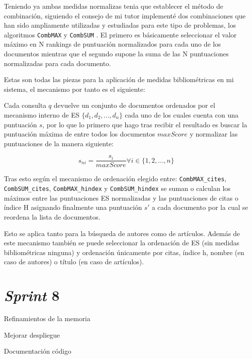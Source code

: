 Teniendo ya ambas medidas normalizas tenia que establecer el método de combinación, siguiendo el consejo de mi tutor implementé dos combinaciones que han sido ampliamente utilizadas y estudiadas para este tipo de problemas, los algoritmos \texttt{CombMAX} y \texttt{CombSUM} \cite{DBLP:conf/trec/ShawF94}. El primero es básicamente seleccionar el valor máximo en N rankings de puntuación normalizados para cada uno de los documentos mientras que el segundo supone la suma de las N puntuaciones normalizadas para cada documento. 

Estas son todas las piezas para la aplicación de medidas bibliométricas en mi sistema, el mecanismo por tanto es el siguiente:

Cada consulta $q$ devuelve un conjunto de documentos ordenados por el mecanismo interno de \acrshort{ES} $\{d_1, d_2, ..., d_n\}$ cada uno de los cuales cuenta con una puntuación $s$, por lo que lo primero que hago tras recibir el resultado es buscar la puntuación máxima de entre todos los documentos $maxScore$ y normalizar las puntuaciones de la manera siguiente:

\begin{equation}
s_{ni} = \frac{s_i}{maxScore} \forall i \in \{1, 2, ..., n\}
\end{equation}

Tras esto según el mecanismo de ordenación elegido entre: \texttt{CombMAX\_cites}, \texttt{CombSUM\_cites}, \texttt{CombMAX\_hindex} y \texttt{CombSUM\_hindex} se suman o calculan los máximos entre las puntuaciones \acrshort{ES} normalizadas y las puntuaciones de citas o índice H asignando finalmente una puntuación $s'$ a cada documento por la cual se reordena la lista de documentos.

Esto se aplica tanto para la búsqueda de autores como de artículos. Además de este mecanismo también se puede seleccionar la ordenación de \acrshort{ES} (sin medidas bibliométricas ninguna) y ordenación únicamente por citas, índice h, nombre (en caso de autores) o título (en caso de artículos).


\section{\textit{Sprint} 8}

Refinamientos de la memoria

Mejorar despliegue

Documentación código